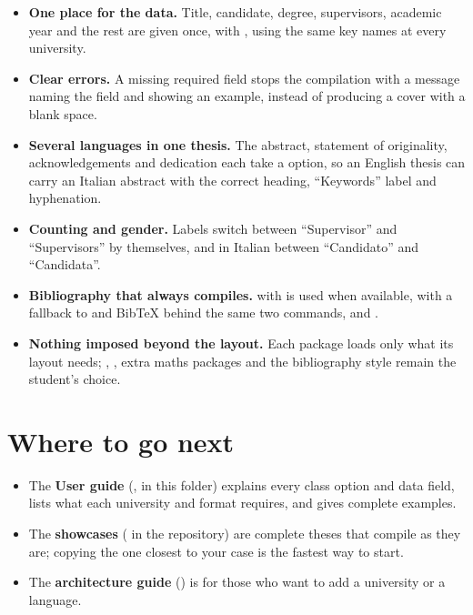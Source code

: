 \documentclass[11pt,a4paper]{article}
\begin{document}
\begin{itemize}
  \item \textbf{One place for the data.} Title, candidate, degree,
    supervisors, academic year and the rest are given once, with
    , using the same key names at every university.
  \item \textbf{Clear errors.} A missing required field stops the
    compilation with a message naming the field and showing an example,
    instead of producing a cover with a blank space.
  \item \textbf{Several languages in one thesis.} The abstract,
    statement of originality, acknowledgements and dedication each take a
     option, so an English thesis can carry an Italian
    abstract with the correct heading, ``Keywords'' label and hyphenation.
  \item \textbf{Counting and gender.} Labels switch between
    ``Supervisor'' and ``Supervisors'' by themselves, and in Italian between
    ``Candidato'' and ``Candidata''.
  \item \textbf{Bibliography that always compiles.}  with
     is used when available, with a fallback to  and
    Bib\TeX{} behind the same two commands,  and
    .
  \item \textbf{Nothing imposed beyond the layout.} Each package loads
    only what its layout needs; , , extra maths
    packages and the bibliography style remain the student's choice.
\end{itemize}

\section{Where to go next}

\begin{itemize}
  \item The \textbf{User guide}
    (, in this folder) explains every
    class option and data field, lists what each university and format
    requires, and gives complete examples.
  \item The \textbf{showcases} ( in the repository) are
    complete theses that compile as they are; copying the one closest to
    your case is the fastest way to start.
  \item The \textbf{architecture guide} () is
    for those who want to add a university or a language.
\end{itemize}
\end{document}
